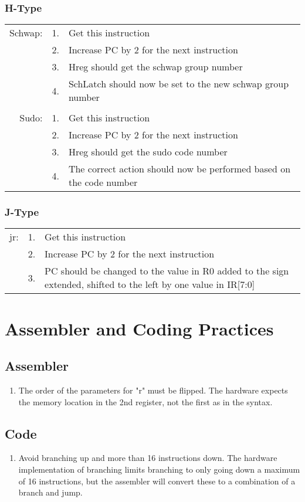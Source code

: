 \documentclass{article}
\begin{document}
		\subsubsection{H-Type}
			\begin{tabular}{ r  r  p{12cm} }
					Schwap: & 1. & Get this instruction\\
					        & 2. & Increase PC by 2 for the next instruction\\
					        & 3. & Hreg should get the schwap group number\\
					        & 4. & SchLatch should now be set to the new schwap group number\\
					        &    & \\
					Sudo:   & 1. & Get this instruction\\
					        & 2. & Increase PC by 2 for the next instruction\\
					        & 3. & Hreg should get the sudo code number\\
					        & 4. & The correct action should now be performed based on the code number\\
			\end{tabular}
		\subsubsection{J-Type}
			\begin{tabular}{ r  r  p{12cm} }
					jr: & 1. & Get this instruction\\
					    & 2. & Increase PC by 2 for the next instruction\\
					    & 3. & PC should be changed to the value in R0 added to the sign extended, shifted to the left by one value in IR[7:0]\\
			\end{tabular}
\section{Assembler and Coding Practices}
	\subsection{Assembler}
		\begin{enumerate}
			\item The order of the parameters for "r" must be flipped.  The hardware expects the memory location in the 2nd register, not the first as in the syntax.
		\end{enumerate}
	\subsection{Code}
		\begin{enumerate}
			\item Avoid branching up and more than 16 instructions down.  The hardware implementation of branching limits branching to only going down a maximum of 16 instructions, but the assembler will convert these to a combination of a branch and jump.
		\end{enumerate}
\end{document}
